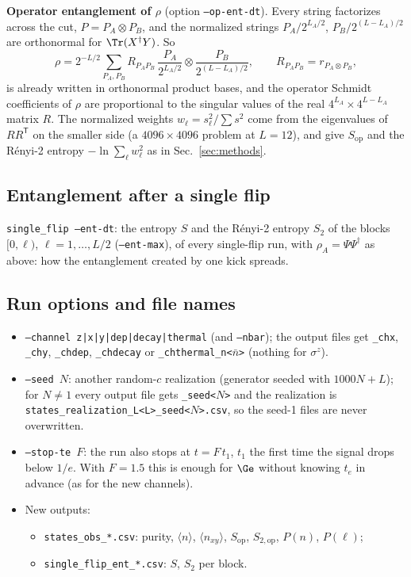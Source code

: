 \textbf{Operator entanglement of $\rho$} (option \texttt{--op-ent-dt}). Every string factorizes across the cut, $P = P_A\otimes P_B$, and the normalized strings $P_A/2^{L_A/2}$, $P_B/2^{(L-L_A)/2}$ are orthonormal for $\Tr(X^\dagger Y)$. So
\begin{equation}
\rho = 2^{-L/2}\sum_{P_A,P_B} R_{P_AP_B}\,\frac{P_A}{2^{L_A/2}}\otimes\frac{P_B}{2^{(L-L_A)/2}}, \qquad R_{P_AP_B} = r_{P_A\otimes P_B},
\end{equation}
is already written in orthonormal product bases, and the operator Schmidt coefficients of $\rho$ are proportional to the singular values of the real $4^{L_A}\times4^{L-L_A}$ matrix $R$. The normalized weights $w_\ell = s_\ell^2/\sum s^2$ come from the eigenvalues of $RR^{\mathsf T}$ on the smaller side (a $4096\times4096$ problem at $L = 12$), and give $S_{\mathrm{op}}$ and the Rényi-2 entropy $-\ln\sum_\ell w_\ell^2$ as in Sec.~\ref{sec:methods}.

\subsection{Entanglement after a single flip}

\texttt{single\_flip --ent-dt}: the entropy $S$ and the R\'enyi-2 entropy $S_2$ of the blocks $[0, \ell)$, $\ell = 1, \dots, L/2$ (\texttt{--ent-max}), of every single-flip run, with $\rho_A = \Psi\Psi^\dagger$ as above: how the entanglement created by one kick spreads.

\subsection{Run options and file names}

\begin{itemize}
\item \texttt{--channel z|x|y|dep|decay|thermal} (and \texttt{--nbar}); the output files get \texttt{\_chx}, \texttt{\_chy}, \texttt{\_chdep}, \texttt{\_chdecay} or \texttt{\_chthermal\_n<$\bar n$>} (nothing for $\sigma^z$).
\item \texttt{--seed $N$}: another random-$c$ realization (generator seeded with $1000N + L$); for $N \ne 1$ every output file gets \texttt{\_seed<$N$>} and the realization is \texttt{states\_realization\_L<L>\_seed<$N$>.csv}, so the seed-1 files are never overwritten.
\item \texttt{--stop-te $F$}: the run also stops at $t = F\,t_1$, $t_1$ the first time the signal drops below $1/e$. With $F = 1.5$ this is enough for $\Ge$ without knowing $t_e$ in advance (as for the new channels).
\item New outputs:
  \begin{itemize}
  \item \texttt{states\_obs\_*.csv}: purity, $\langle n\rangle$, $\langle n_{xy}\rangle$, $S_{\mathrm{op}}$, $S_{2,\mathrm{op}}$, $P(n)$, $P(\ell)$;
  \item \texttt{single\_flip\_ent\_*.csv}: $S$, $S_2$ per block.
  \end{itemize}
\end{itemize}

